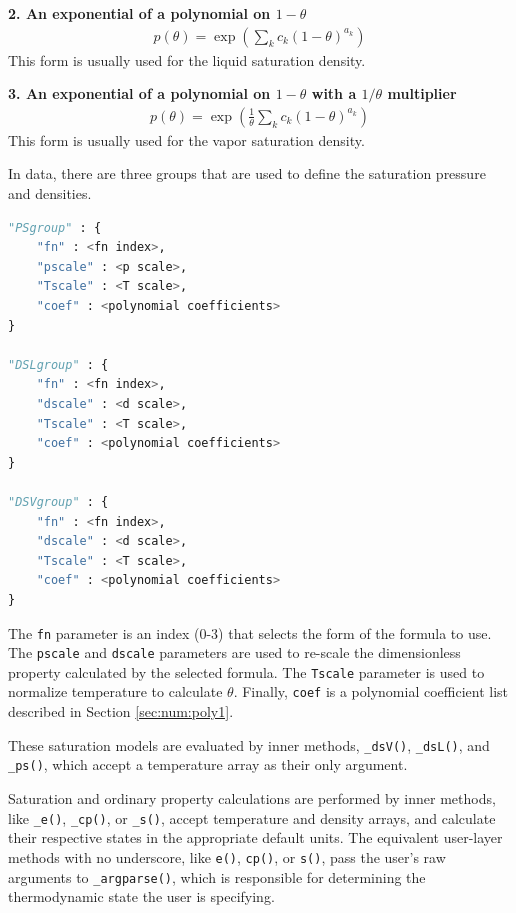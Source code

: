 {\bf 2. An exponential of a polynomial on $1-\theta$}
\begin{align}
p(\theta) = \exp \left( \sum_k c_k (1-\theta)^{a_k} \right)
\end{align}
This form is usually used for the liquid saturation density.

{\bf 3. An exponential of a polynomial on $1-\theta$ with a $1/\theta$ multiplier}
\begin{align}
p(\theta) = \exp \left( \frac{1}{\theta} \sum_k c_k (1-\theta)^{a_k} \right)
\end{align}
This form is usually used for the vapor saturation density.

In data, there are three groups that are used to define the saturation pressure and densities.
\begin{lstlisting}[language=Python]
"PSgroup" : {
    "fn" : <fn index>,
    "pscale" : <p scale>,
    "Tscale" : <T scale>,
    "coef" : <polynomial coefficients>
}

"DSLgroup" : {
    "fn" : <fn index>,
    "dscale" : <d scale>,
    "Tscale" : <T scale>,
    "coef" : <polynomial coefficients>
}

"DSVgroup" : {
    "fn" : <fn index>,
    "dscale" : <d scale>,
    "Tscale" : <T scale>,
    "coef" : <polynomial coefficients>
}
\end{lstlisting}

The \texttt{fn} parameter is an index (0-3) that selects the form of the formula to use.  The \texttt{pscale} and \texttt{dscale} parameters are used to re-scale the dimensionless property calculated by the selected formula.  The \texttt{Tscale} parameter is used to normalize temperature to calculate $\theta$.  Finally, \texttt{coef} is a polynomial coefficient list described in Section \ref{sec:num:poly1}.

These saturation models are evaluated by inner methods, \verb|_dsV()|, \verb|_dsL()|, and \verb|_ps()|, which accept a temperature array as their only argument.

Saturation and ordinary property calculations are performed by inner methods, like \verb|_e()|, \verb|_cp()|, or \verb|_s()|, accept temperature and density arrays, and calculate their respective states in the appropriate default units.  The equivalent user-layer methods with no underscore, like \texttt{e()}, \texttt{cp()}, or \texttt{s()}, pass the user's raw arguments to \verb|_argparse()|, which is responsible for determining the thermodynamic state the user is specifying.  

